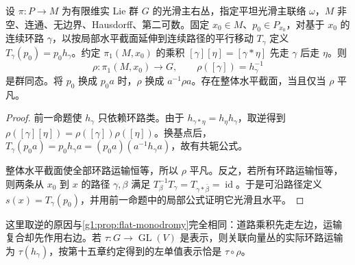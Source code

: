 \begin{proposition}\label{g1:prop:flat-principal-monodromy}
	设 \(\pi:P\to M\) 为有限维实 Lie 群 \(G\) 的光滑主右丛，指定平坦光滑主联络 \(\omega\)，\(M\) 非空、连通、无边界、Hausdorff、第二可数。固定 \(x_0\in M\)、\(p_0\in P_{x_0}\)，对基于 \(x_0\) 的连续环路 \(\gamma\)，以按局部水平截面延伸到连续路径的平行移动 \(T_\gamma\) 定义 \(T_\gamma(p_0)=p_0h_\gamma\)。约定 \(\pi_1(M,x_0)\) 的乘积 \([\gamma][\eta]=[\gamma*\eta]\) 先走 \(\gamma\) 后走 \(\eta\)。则
	\begin{equation}\label{g1:eq:principal-monodromy-convention}
		\rho:\pi_1(M,x_0)\longrightarrow G,\qquad
		\rho([\gamma])=h_\gamma^{-1}
	\end{equation}
	是群同态。将 \(p_0\) 换成 \(p_0a\) 时，\(\rho\) 换成 \(a^{-1}\rho a\)。存在整体水平截面，当且仅当 \(\rho\) 平凡。
\end{proposition}
\begin{proof}
	前一命题使 \(h_\gamma\) 只依赖环路类。由于 \(h_{\gamma*\eta}=h_\eta h_\gamma\)，取逆得到 \(\rho([\gamma][\eta])=\rho([\gamma])\rho([\eta])\)。换基点后，\(T_\gamma(p_0a)=p_0h_\gamma a=(p_0a)(a^{-1}h_\gamma a)\)，故有共轭公式。

	整体水平截面使全部环路运输恒等，所以 \(\rho\) 平凡。反之，若所有环路运输恒等，则两条从 \(x_0\) 到 \(x\) 的路径 \(\gamma,\beta\) 满足 \(T_\beta^{-1}T_\gamma=T_{\gamma*\bar\beta}=\operatorname{id}\)。于是可沿路径定义 \(s(x)=T_\gamma(p_0)\)，并用前一命题中的局部公式证明它光滑且水平。
\end{proof}

这里取逆的原因与\cref{g1:prop:flat-monodromy}完全相同：道路乘积先走左边，运输复合却先作用右边。若 \(\tau:G\to\operatorname{GL}(V)\) 是表示，则关联向量丛的实际环路运输为 \(\tau(h_\gamma)\)，按第十五章约定得到的左单值表示恰是 \(\tau\circ\rho\)。

